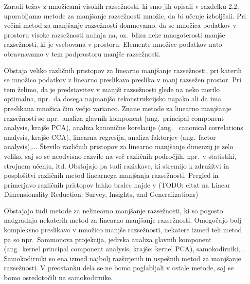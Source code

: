 \documentclass[12pt,a4paper,twoside]{article}
\theoremstyle{definition} %
\theoremstyle{plain} %
\numberwithin{equation}{section}  %
\begin{document}
Zaradi težav z množicami visokih razsežnosti, ki smo jih opisali v razdelku $2.2$, uporabljamo metode za manjšanje razsežnosti množic, da bi učenje izboljšali. 
Pri večini metod za manjšanje razsežnosti domnevamo, da se množica podatkov v prostoru visoke razsežnosti nahaja na, 
oz.~blizu neke mnogoterosti manjše razsežnosti, ki je vsebovana v prostoru. Elemente množice podatkov nato obravnavamo v tem podprostoru manjše razsežnosti.

Obstaja veliko različnih pristopov za linearno manjšanje razsežnosti, pri katerih se množico podatkov z linearno preslikavo preslika v manj razsežen prostor. 
Pri tem želimo, da je predstavitev v manjši razsežnosti glede na neko merilo optimalna, npr.\ da dosega najmanjšo rekonstrukcijsko napako ali da ima preslikana množica čim večjo varianco. 
Znane metode za linearno manjšanje razsežnosti so npr.\ analiza glavnih komponent (ang.~principal component analysis, krajše PCA), 
analiza kanonične korelacije (ang.~ canonical correlations analysis, krajše CCA), linearna regresija, analiza faktorjev (ang.~factor analysis),... 
Število različnih pristopov za linearno manjšanje dimenzij je zelo veliko, saj so se neodvisno razvile na več različnih področjih, npr.\ v statistiki, strojnem učenju, itd. 
Obstajajo pa tudi raziskave, ki stremijo k združitvi in posplošitvi različnih metod linearnega manjšanja razsežnosti. Pregled in primerjavo različnih pristopov lahko bralec najde v (TODO: citat na Linear Dimensionality Reduction: Survey, Insights, and Generalizations)

Obstajajo tudi metode za nelinearno manjšanje razsežnosti, ki so pogosto nadgradnja nekaterih metod za linearno manjšanje razsežnosti. 
Omogočajo bolj kompleksno preslikavo v množico manjše razsežnosti, nekatere izmed teh metod pa so npr.\ Sammonova projekcija, jedrska analiza glavnih komponent (ang.~kernel principal component analysis, krajše: kernel PCA), samokodirniki,...
Samokodirniki so ena izmed najbolj razširjenih in uspešnih metod za manjšanje razsežnosti. 
V preostanku dela se ne bomo poglabljali v ostale metode, saj se bomo osredotočili na samokodirnike.
\end{document}
